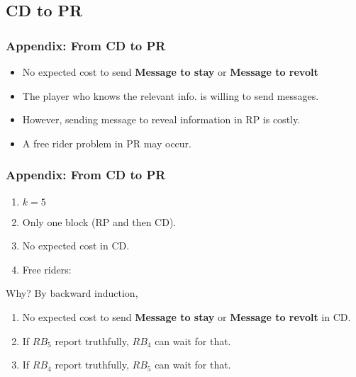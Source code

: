 \documentclass[9pt]{beamer}
\begin{document}
\subsection{CD to PR}
\begin{frame}[label=CD_to_RP]
\frametitle{Appendix: From CD to PR}

\begin{itemize}
\item \alert{No expected cost} to send \textbf{Message to stay}  or \textbf{Message to revolt} 
\item The player who knows the relevant info. is willing to send messages.

\end{itemize}
\bigskip
\pause
\begin{itemize}
\item However, sending message to reveal information in RP is costly. 
\item A free rider problem in PR may occur.
\end{itemize}

\end{frame}



\begin{frame}
\frametitle{Appendix: From CD to PR}


\begin{enumerate}
\item $k=5$
\item Only one block (RP and then CD).
\item No expected cost in CD.
\pause
\item \alert{Free riders}:
\begin{center}
\end{center}

\end{enumerate}

\pause
Why? By backward induction,
\begin{enumerate}
\item {No expected cost} to send \textbf{Message to stay}  or \textbf{Message to revolt} in CD. 
\item If $RB_5$ report truthfully, $RB_4$ can wait for that.
\item If $RB_4$ report truthfully, $RB_5$ can wait for that.
\end{enumerate}

\hyperlink{protocol_grim_trigger}{}
\end{frame}
\end{document}
